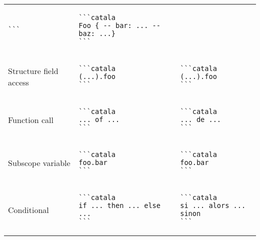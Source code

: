 \documentclass[a3paper,landscape]{article}
\begin{document}
\begin{multicols*}{2}
\begin{center}
\begin{tabular}{p{}p{}p{}}
\begin{verbatim}
```
\end{verbatim}
\vspace*{-1.75em}
&
\vspace*{-1.75em}
\begin{verbatim}
```catala
Foo { -- bar: ... -- baz: ...}
```
\end{verbatim}
\vspace*{-1.75em}
\\
Structure field access&
\vspace*{-1.75em}
\begin{verbatim}
```catala
(...).foo
```
\end{verbatim}
\vspace*{-1.75em}
&
\vspace*{-1.75em}
\begin{verbatim}
```catala
(...).foo
```
\end{verbatim}
\vspace*{-1.75em}
\\
Function call&
\vspace*{-1.75em}
\begin{verbatim}
```catala
... of ...
```
\end{verbatim}
\vspace*{-1.75em}
&
\vspace*{-1.75em}
\begin{verbatim}
```catala
... de ...
```
\end{verbatim}
\vspace*{-1.75em}
\\
Subscope variable&
\vspace*{-1.75em}
\begin{verbatim}
```catala
foo.bar
```
\end{verbatim}
\vspace*{-1.75em}
&
\vspace*{-1.75em}
\begin{verbatim}
```catala
foo.bar
```
\end{verbatim}
\vspace*{-1.75em}
\\
Conditional&
\vspace*{-1.75em}
\begin{verbatim}
```catala
if ... then ... else ...
```
\end{verbatim}
\vspace*{-1.75em}
&
\vspace*{-1.75em}
\begin{verbatim}
```catala
si ... alors ... sinon
```
\end{verbatim}
\vspace*{-1.75em}
\\
\bottomrule
\end{tabular}
\end{center}


\end{multicols*}
\end{document}
